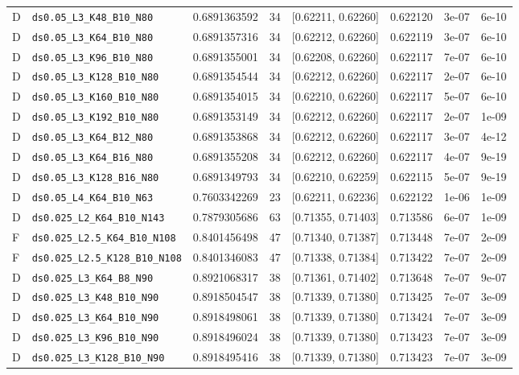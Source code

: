 \begin{longtable}{@{}llrllllr@{}}
D & \texttt{ds0.05\_L3\_K48\_B10\_N80} & 0.6891363592 & 34 & [0.62211, 0.62260] & 0.622120 & 3e-07 & 6e-10\\
D & \texttt{ds0.05\_L3\_K64\_B10\_N80} & 0.6891357316 & 34 & [0.62212, 0.62260] & 0.622119 & 3e-07 & 6e-10\\
D & \texttt{ds0.05\_L3\_K96\_B10\_N80} & 0.6891355001 & 34 & [0.62208, 0.62260] & 0.622117 & 7e-07 & 6e-10\\
D & \texttt{ds0.05\_L3\_K128\_B10\_N80} & 0.6891354544 & 34 & [0.62212, 0.62260] & 0.622117 & 2e-07 & 6e-10\\
D & \texttt{ds0.05\_L3\_K160\_B10\_N80} & 0.6891354015 & 34 & [0.62210, 0.62260] & 0.622117 & 5e-07 & 6e-10\\
D & \texttt{ds0.05\_L3\_K192\_B10\_N80} & 0.6891353149 & 34 & [0.62212, 0.62260] & 0.622117 & 2e-07 & 1e-09\\
D & \texttt{ds0.05\_L3\_K64\_B12\_N80} & 0.6891353868 & 34 & [0.62212, 0.62260] & 0.622117 & 3e-07 & 4e-12\\
D & \texttt{ds0.05\_L3\_K64\_B16\_N80} & 0.6891355208 & 34 & [0.62212, 0.62260] & 0.622117 & 4e-07 & 9e-19\\
D & \texttt{ds0.05\_L3\_K128\_B16\_N80} & 0.6891349793 & 34 & [0.62210, 0.62259] & 0.622115 & 5e-07 & 9e-19\\
D & \texttt{ds0.05\_L4\_K64\_B10\_N63} & 0.7603342269 & 23 & [0.62211, 0.62236] & 0.622122 & 1e-06 & 1e-09\\
D & \texttt{ds0.025\_L2\_K64\_B10\_N143} & 0.7879305686 & 63 & [0.71355, 0.71403] & 0.713586 & 6e-07 & 1e-09\\
F & \texttt{ds0.025\_L2.5\_K64\_B10\_N108} & 0.8401456498 & 47 & [0.71340, 0.71387] & 0.713448 & 7e-07 & 2e-09\\
F & \texttt{ds0.025\_L2.5\_K128\_B10\_N108} & 0.8401346083 & 47 & [0.71338, 0.71384] & 0.713422 & 7e-07 & 2e-09\\
D & \texttt{ds0.025\_L3\_K64\_B8\_N90} & 0.8921068317 & 38 & [0.71361, 0.71402] & 0.713648 & 7e-07 & 9e-07\\
D & \texttt{ds0.025\_L3\_K48\_B10\_N90} & 0.8918504547 & 38 & [0.71339, 0.71380] & 0.713425 & 7e-07 & 3e-09\\
D & \texttt{ds0.025\_L3\_K64\_B10\_N90} & 0.8918498061 & 38 & [0.71339, 0.71380] & 0.713424 & 7e-07 & 3e-09\\
D & \texttt{ds0.025\_L3\_K96\_B10\_N90} & 0.8918496024 & 38 & [0.71339, 0.71380] & 0.713423 & 7e-07 & 3e-09\\
D & \texttt{ds0.025\_L3\_K128\_B10\_N90} & 0.8918495416 & 38 & [0.71339, 0.71380] & 0.713423 & 7e-07 & 3e-09\\

\end{longtable}

